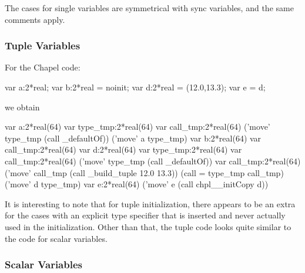 The cases for single variables are symmetrical with sync variables, and the same comments
apply.

\subsubsection{Tuple Variables}

For the Chapel code:
\begin{chapel}
  var a:2*real;
  var b:2*real = noinit;
  var d:2*real = (12.0,13.3);
  var e = d;
\end{chapel}
\noindent
we obtain
\begin{chapelcode}
    var a:2*real(64)
    {
      var type_tmp:2*real(64)
      var call_tmp:2*real(64)
      ('move' type_tmp (call _defaultOf))
      ('move' a type_tmp)
    }
    var b:2*real(64)
    var call_tmp:2*real(64)
    var d:2*real(64)
    {
      var type_tmp:2*real(64)
      var call_tmp:2*real(64)
      ('move' type_tmp (call _defaultOf))
      var call_tmp:2*real(64)
      ('move' call_tmp (call _build_tuple 12.0 13.3))
      (call = type_tmp call_tmp)
      ('move' d type_tmp)
    }
    var e:2*real(64)
    ('move' e (call chpl__initCopy d))
\end{chapelcode}
\noindent
It is interesting to note that for tuple initialization, there appears to be an extra
 for the cases with an explicit type specifier that is inserted and never
actually used in the initialization.   Other than that, the tuple code looks quite similar
to the code for scalar variables.

\subsubsection{Scalar Variables}

